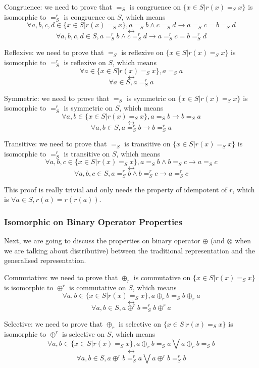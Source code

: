 \documentclass[a4paper,12pt,twoside,openright]{report}
\begin{document}
Congruence: we need to prove that $=_S$ is congruence on $\{x \in S | r(x) =_S x\}$ is isomorphic to $=^r_S$ is congruence on $S$, which means 
\[\forall a,b,c,d \in \{x \in S | r(x) =_S x \}, a =_S b \wedge c =_S d \rightarrow a =_S c = b =_S d \]
\[\longleftrightarrow \]
\[\forall a,b,c,d \in S, a =^r_S b \wedge c =^r_S d \rightarrow a =^r_S c = b =^r_S d
\]

Reflexive: we need to prove that $=_S$ is reflexive on $\{x \in S | r(x) =_S x \}$ is isomorphic to $=^r_S$ is reflexive on $S$, which means 
\[\forall a \in \{x \in S | r(x) =_S x \}, a =_S a \]
\[\longleftrightarrow \]
\[\forall a \in S, a =^r_S a
\]

Symmetric: we need to prove that $=_S$ is symmetric on $\{x \in S | r(x) =_S x\}$ is isomorphic to $=^r_S$ is symmetric on $S$, which means 
\[\forall a,b \in \{x \in S | r(x) =_S x \}, a =_S b \rightarrow b =_S a \]
\[\longleftrightarrow \]
\[\forall a,b \in S, a =^r_S b \rightarrow b =^r_S a
\]

Transitive: we need to prove that $=_S$ is transitive on $\{x \in S | r(x) =_S x \}$ is isomorphic to $=^r_S$ is transitive on $S$, which means 
\[\forall a,b,c \in \{x \in S | r(x) =_S x \}, a =_S b \wedge b =_S c \rightarrow a =_S c \]
\[\longleftrightarrow \]
\[\forall a,b,c \in S, a =^r_S b \wedge b =^r_S c \rightarrow a =^r_S c
\]

This proof is really trivial and only needs the property of idempotent of $r$, which is $\forall a \in S, r(a) = r(r(a))$. 

\subsubsection{Isomorphic on Binary Operator Properties}
Next, we are going to discuss the properties on binary operator $\oplus$ (and $\otimes$ when we are talking about distributive) between the traditional representation and the generalised representation.

Commutative: we need to prove that $\oplus_r$ is commutative on $\{x \in S | r(x) =_S x\}$ is isomorphic to $\oplus^r$ is commutative on $S$, which means 
\[\forall a,b \in \{x \in S | r(x) =_S x \}, a \oplus_r b =_S b \oplus_r a \]
\[\longleftrightarrow \]
\[\forall a,b \in S, a \oplus^r b =^r_S b \oplus^r a
\]

Selective: we need to prove that $\oplus_r$ is selective on $\{x \in S | r(x) =_S x\}$ is isomorphic to $\oplus^r$ is selective on $S$, which means 
\[\forall a,b \in \{x \in S | r(x) =_S x\}, a \oplus_r b =_S a \bigvee a \oplus_r b =_S b \]
\[\longleftrightarrow \]
\[\forall a,b \in S, a \oplus^r b =^r_S a \bigvee a \oplus^r b =^r_S b
\]
\end{document}
